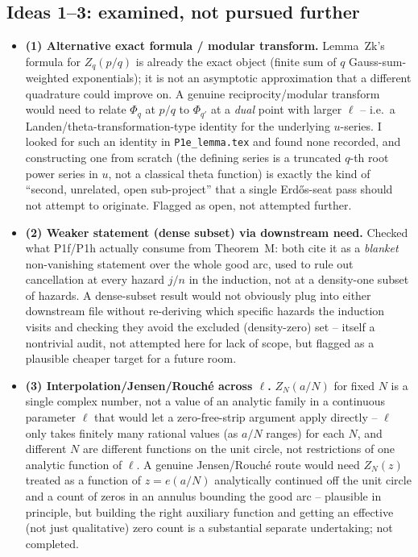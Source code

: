 \documentclass[11pt]{article}
\begin{document}
\subsection{Ideas 1--3: examined, not pursued further}
\begin{itemize}
\item \textbf{(1) Alternative exact formula / modular transform.} Lemma~Zk's formula for
$Z_q(p/q)$ is already the exact object (finite sum of $q$ Gauss-sum-weighted exponentials); it is
not an asymptotic approximation that a different quadrature could improve on. A genuine
reciprocity/modular transform would need to relate $\Phi_q$ at $p/q$ to $\Phi_{q'}$ at a
\emph{dual} point with larger $\ell$ -- i.e.\ a Landen/theta-transformation-type identity for the
underlying $u$-series. I looked for such an identity in \texttt{P1e\_lemma.tex} and found none
recorded, and constructing one from scratch (the defining series is a truncated $q$-th root
power series in $u$, not a classical theta function) is exactly the kind of ``second, unrelated,
open sub-project'' that a single Erd\H{o}s-seat pass should not attempt to originate. Flagged as
open, not attempted further.
\item \textbf{(2) Weaker statement (dense subset) via downstream need.} Checked what P1f/P1h
actually consume from Theorem~M: both cite it as a \emph{blanket} non-vanishing statement over the
whole good arc, used to rule out cancellation at every hazard $j/n$ in the induction, not at a
density-one subset of hazards. A dense-subset result would not obviously plug into either
downstream file without re-deriving which specific hazards the induction visits and checking they
avoid the excluded (density-zero) set -- itself a nontrivial audit, not attempted here for lack of
scope, but flagged as a plausible cheaper target for a future room.
\item \textbf{(3) Interpolation/Jensen/Rouch\'e across $\ell$.} $Z_N(a/N)$ for fixed $N$ is a
single complex number, not a value of an analytic family in a continuous parameter $\ell$ that
would let a zero-free-strip argument apply directly -- $\ell$ only takes finitely many rational
values (as $a/N$ ranges) for each $N$, and different $N$ are different functions on the unit
circle, not restrictions of one analytic function of $\ell$. A genuine Jensen/Rouch\'e route would
need $Z_N(z)$ treated as a function of $z=e(a/N)$ analytically continued off the unit circle and a
count of zeros in an annulus bounding the good arc -- plausible in principle, but building the
right auxiliary function and getting an effective (not just qualitative) zero count is a
substantial separate undertaking; not completed.
\end{itemize}
\end{document}
